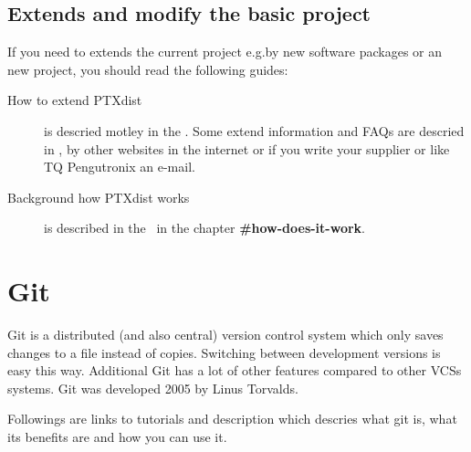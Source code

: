 \subsection{Extends and modify the basic project }%
\label{sub:extends_project}

If you need to extends the current project e.g.\@ by new software packages or an
new project, you should read the following guides:
\begin{description}
    \item[How to extend PTXdist] is descried motley in the
        \textbf{\cite[developer guide]{ptxdist_developer}}. Some extend
        information and \glspl{FAQ} are descried in
        \textbf{\cite{ptxdist_workflows}}, by other websites in the internet
        or if you write your supplier or like TQ Pengutronix an e-mail.

    \item[Background how PTXdist works] is described in the~\cite[PTXdist Users
        Manual]{ptxdist_manual} in the chapter \textbf{\#how-does-it-work}.
\end{description}


\section{Git}%
\label{sec:git}
Git is a distributed (and also central) version control system which only saves
changes to a file instead of copies. Switching between development versions is
easy this way. Additional Git has a lot of other features compared to other
\glspl{VCS} systems. Git was developed 2005 by Linus Torvalds.

Followings are links to tutorials and description which descries what git is,
what its benefits are  and how you can use it.


